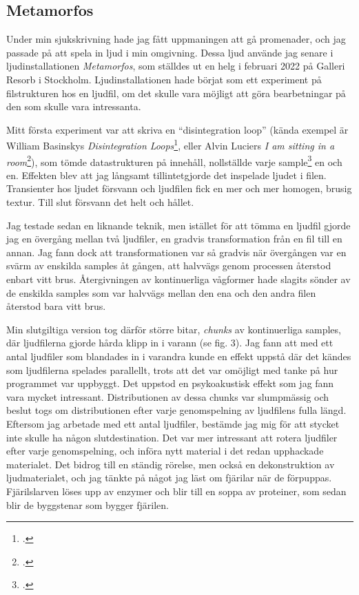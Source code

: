 \documentclass{article}
\begin{document}
\subsection{Metamorfos}\nocite{META}
Under min sjukskrivning hade jag fått uppmaningen att gå promenader, och jag passade på att spela in ljud i
min omgivning. Dessa ljud använde jag senare i ljudinstallationen \emph{Metamorfos}, som ställdes ut en helg i
februari 2022 på Galleri Resorb i Stockholm. Ljudinstallationen hade börjat som ett experiment på
filstrukturen hos en ljudfil, om det skulle vara möjligt att göra bearbetningar på den som skulle vara
intressanta. 

Mitt första experiment var att skriva en ``disintegration loop'' (kända
exempel är William Basinskys \emph{Disintegration Loops}\footcite{Basinski}, eller Alvin Luciers \emph{I am sitting in a
room}\footcite{Lucier}), som tömde datastrukturen på innehåll, nollställde varje sample\footcite[1-3]{audioFX} en och en. Effekten
blev att jag långsamt tillintetgjorde det inspelade ljudet i filen. Transienter hos ljudet försvann och
ljudfilen fick en mer och mer homogen, brusig textur. Till slut försvann det helt och hållet.

Jag testade sedan en liknande teknik, men istället för att tömma en ljudfil gjorde jag en övergång
mellan två ljudfiler, en gradvis transformation från en fil till en annan. Jag fann dock att
transformationen var så gradvis när övergången var en svärm av enskilda samples åt gången, att halvvägs genom
processen återstod enbart vitt brus. Återgivningen av kontinuerliga vågformer hade slagits sönder av de
enskilda samples som 
var halvvägs mellan den ena och den andra filen återstod bara vitt brus.

Min slutgiltiga version tog därför större bitar, \emph{chunks} av kontinuerliga samples, där ljudfilerna gjorde
hårda klipp in i varann (se fig. 3). Jag fann att med ett antal ljudfiler som blandades in i varandra kunde en effekt
uppstå där det kändes som ljudfilerna spelades parallellt, trots att det var omöjligt med tanke på hur
programmet var uppbyggt. Det uppstod en psykoakustisk effekt som jag fann vara mycket intressant.
Distributionen av dessa chunks var slumpmässig och beslut togs om distributionen efter varje genomspelning
av ljudfilens fulla längd. Eftersom jag arbetade med ett antal ljudfiler, bestämde jag mig för att stycket
inte skulle ha någon slutdestination. Det var mer intressant att rotera ljudfiler efter varje genomspelning,
och införa nytt material i det redan upphackade materialet. Det bidrog till en ständig rörelse, men också en
dekonstruktion av ljudmaterialet, och jag tänkte på något jag läst om fjärilar när de förpuppas. Fjärilslarven
löses upp av enzymer och blir till en soppa av proteiner, som sedan blir de byggstenar som bygger fjärilen.
\end{document}
